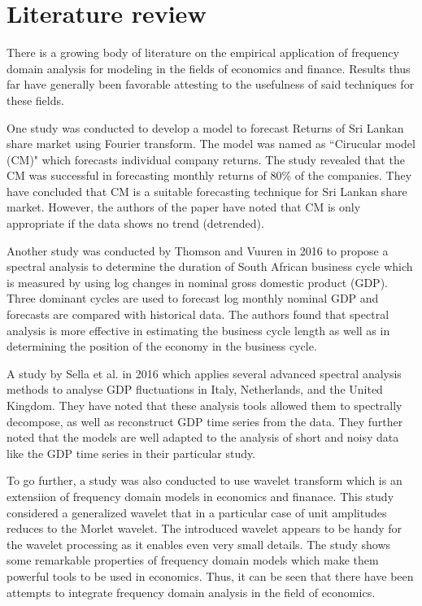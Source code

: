 
\section{Literature review}

There is a growing body of literature on the empirical application of frequency domain
analysis for modeling in the fields of economics and finance. Results thus far have generally been favorable attesting to the usefulness of said techniques for these fields.

One study \cite{konarasinghe2016circular} was conducted to develop a model to forecast Returns of Sri Lankan share market using Fourier transform. The model was named as ``Cirucular model (CM)" which forecasts individual company returns. The study revealed that the CM was successful in forecasting monthly returns of $80\%$ of the companies. They have concluded that CM is a suitable forecasting technique for Sri Lankan share market. However, the authors of the paper have noted that CM is only appropriate if the data shows no trend (detrended).

Another study was conducted by Thomson and Vuuren in 2016 \cite{thomson2016forecasting} to propose a spectral analysis to determine the duration of South African business cycle which is measured by using log changes in nominal gross domestic product (GDP). Three dominant cycles are used to forecast log monthly nominal GDP and forecasts are compared with historical data. The authors found that spectral analysis is more effective in estimating the business cycle length as well as in determining the position of the economy in the business cycle.

A study by Sella et al. in 2016 \cite{sella2010economic} which applies several advanced spectral analysis methods to analyse GDP fluctuations in Italy, Netherlands, and the United Kingdom. They have noted that these analysis tools allowed them to spectrally decompose, as well as reconstruct GDP time series from the data. They further noted that the models are well adapted to the analysis of short and noisy data like the GDP time series in their particular study.

To go further, a study \cite{de2015quantitative} was also conducted to use wavelet transform which is an extensiion of frequency domain models in economics and finanace. This study considered a generalized wavelet that in a particular case of unit amplitudes reduces to the Morlet wavelet. The introduced wavelet appears to be handy for the wavelet processing as it enables even very small details. The study shows some remarkable properties of frequency domain models which make them powerful tools to be used in economics. Thus, it can be seen that there have been attempts to integrate frequency domain analysis in the field of economics.

